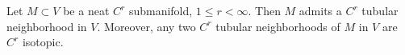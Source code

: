 Let $M \subset V$ be a neat $C^r$ submanifold, $1 \leqslant r < \infty$. Then $M$ admits a $C^r$ tubular neighborhood in $V$. Moreover, any two $C^r$ tubular neighborhoods of $M$ in $V$ are $C^r$ isotopic.
